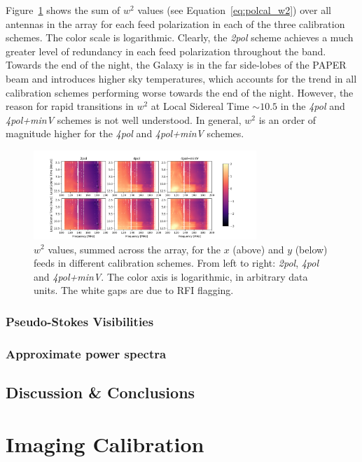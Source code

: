 Figure~\ref{fig:polcal_chisq} shows the sum of $w^2$ values (see Equation~\ref{eq:polcal_w2}) over all antennas in the array for each feed polarization in each of the three calibration schemes. The color scale is logarithmic. Clearly, the \textit{2pol} scheme achieves a much greater level of redundancy in each feed polarization throughout the band. Towards the end of the night, the Galaxy is in the far side-lobes of the PAPER beam and introduces higher sky temperatures, which accounts for the trend in all calibration schemes performing worse towards the end of the night. However, the reason for rapid transitions in $w^2$ at Local Sidereal Time $\sim 10.5$ in the \textit{4pol} and \textit{4pol+minV} schemes is not well understood. In general, $w^2$ is an order of magnitude higher for the \textit{4pol} and \textit{4pol+minV} schemes.

\begin{figure}
\centering
\includegraphics[width=0.75\textwidth]{chapters/polcal/figures/chisq.png}
\caption[$w^2$ values, summed across the array.]{$w^2$ values, summed across the array, for the $x$ (above) and $y$ (below) feeds in different calibration schemes. From left to right: \textit{2pol}, \textit{4pol} and \textit{4pol+minV}. The color axis is logarithmic, in arbitrary data units. The white gaps are due to RFI flagging.}
\label{fig:polcal_chisq}
\end{figure}

\subsubsection{Pseudo-Stokes Visibilities}

\subsubsection{Approximate power spectra}



\subsection{Discussion \& Conclusions}
\label{sec:polcal_disc}


\section{Imaging Calibration}
\label{sec:polcal_imagecal}





